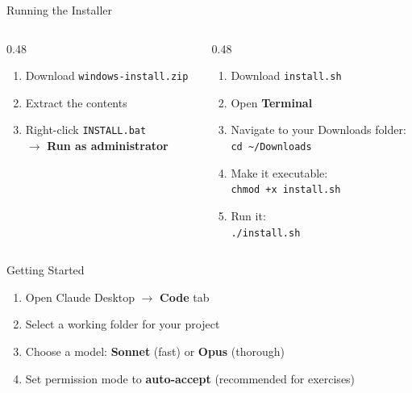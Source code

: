 \documentclass[aspectratio=169]{beamer}
\begin{document}
\begin{frame}{Running the Installer}
\begin{columns}[T]
\begin{column}{0.48\textwidth}
\begin{shadedbox}[title=\textbf{Windows}]
\begin{enumerate}\small
  \item Download \texttt{windows-install.zip}
  \item Extract the contents
  \item Right-click \texttt{INSTALL.bat}\\$\rightarrow$ \textbf{Run as administrator}
\end{enumerate}
\end{shadedbox}
\end{column}
\begin{column}{0.48\textwidth}
\begin{shadedbox}[title=\textbf{Mac}]
\begin{enumerate}\small
  \item Download \texttt{install.sh}
  \item Open \textbf{Terminal}
  \item Navigate to your Downloads folder:\\[2pt]
    \texttt{\footnotesize cd \textasciitilde/Downloads}
  \item Make it executable:\\[2pt]
    \texttt{\footnotesize chmod +x install.sh}
  \item Run it:\\[2pt]
    \texttt{\footnotesize ./install.sh}
\end{enumerate}
\end{shadedbox}
\end{column}
\end{columns}
\end{frame}

\begin{frame}{Getting Started}
\begin{enumerate}
  \item Open Claude Desktop $\rightarrow$ \textbf{Code} tab
  \item Select a working folder for your project
  \item Choose a model: \textbf{Sonnet} (fast) or \textbf{Opus} (thorough)
  \item Set permission mode to \textbf{auto-accept} (recommended for exercises)
\end{enumerate}
\end{frame}
\end{document}
